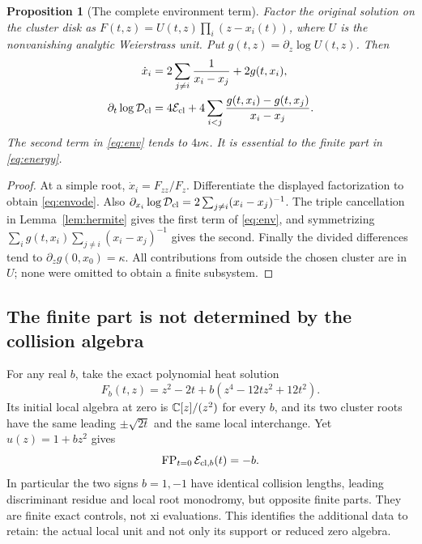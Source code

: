 \documentclass[11pt,a4paper]{article}
\newtheorem{proposition}[theorem]{Proposition}
\theoremstyle{definition}
\newcommand{\FP}{\operatorname{FP}}\newcommand{\im}{\operatorname{im}}
\begin{document}
\begin{proposition}[The complete environment term]\label{prop:environment}
Factor the original solution on the cluster disk as
$F(t,z)=U(t,z)\prod_i(z-x_i(t))$, where $U$ is the nonvanishing analytic Weierstrass unit. Put $g(t,z)=\partial_z\log U(t,z)$. Then
\begin{align}
 \dot x_i&=2\sum_{j\ne i}\frac1{x_i-x_j}+2g(t,x_i),\label{eq:envode}\\
 \partial_t\log\mathcal D_{\rm cl}
 &=4\mathcal E_{\rm cl}
 +4\sum_{i<j}\frac{g(t,x_i)-g(t,x_j)}{x_i-x_j}.\label{eq:env}
\end{align}
The second term in \eqref{eq:env} tends to $4\nu\kappa$. It is essential to the finite part in \eqref{eq:energy}.
\end{proposition}
\begin{proof}
At a simple root, $\dot x_i=F_{zz}/F_z$. Differentiate the displayed factorization to obtain \eqref{eq:envode}. Also
$\partial_{x_i}\log\mathcal D_{\rm cl}=2\sum_{j\ne i}(x_i-x_j)^{-1}$.
The triple cancellation in Lemma~\ref{lem:hermite} gives the first term of \eqref{eq:env}, and symmetrizing $\sum_i g(t,x_i)\sum_{j\ne i}(x_i-x_j)^{-1}$ gives the second. Finally the divided differences tend to $\partial_zg(0,x_0)=\kappa$. All contributions from outside the chosen cluster are in $U$; none were omitted to obtain a finite subsystem.
\end{proof}

\subsection{The finite part is not determined by the collision algebra}
For any real $b$, take the exact polynomial heat solution
\[
 F_b(t,z)=z^2-2t+b(z^4-12tz^2+12t^2).
\]
Its initial local algebra at zero is $\mathbb C[z]/(z^2)$ for every $b$, and its two cluster roots have the same leading $\pm\sqrt{2t}$ and the same local interchange. Yet $u(z)=1+bz^2$ gives
\begin{equation}\label{eq:oppositefp}
 \FP_{t=0}\mathcal E_{{\rm cl},b}(t)=-b.
\end{equation}
In particular the two signs $b=1,-1$ have identical collision lengths, leading discriminant residue and local root monodromy, but opposite finite parts. They are finite exact controls, not xi evaluations. This identifies the additional data to retain: the actual local unit and not only its support or reduced zero algebra.
\end{document}
